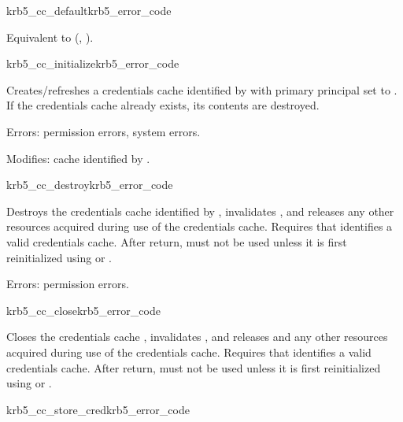 \begin{funcdecl}{krb5_cc_default}{krb5_error_code}{\funcinout}
\funcout
{}
\end{funcdecl}

Equivalent to
(,
).

\begin{funcdecl}{krb5_cc_initialize}{krb5_error_code}{\funcinout}
\funcin
{}
\end{funcdecl}

Creates/refreshes a credentials cache identified by  with
primary principal set to .
If the credentials cache already exists, its contents are destroyed.

Errors:  permission errors, system errors.

Modifies: cache identified by .

\begin{funcdecl}{krb5_cc_destroy}{krb5_error_code}{\funcinout}
\end{funcdecl}

Destroys the credentials cache identified by , invalidates
, and releases any other resources acquired during use of
the credentials cache.  Requires that  identifies a valid
credentials cache.  After return,  must not be used unless
it is first reinitialized using  or
.

Errors:  permission errors.

\begin{funcdecl}{krb5_cc_close}{krb5_error_code}{\funcinout}
\end{funcdecl}

Closes the credentials cache , invalidates
, and releases  and any other resources
acquired during use of the credentials cache.  Requires that
 identifies a valid credentials cache.  After return,
 must not be used unless it is first reinitialized using
 or .


\begin{funcdecl}{krb5_cc_store_cred}{krb5_error_code}{\funcinout}
\funcin
{}
\end{funcdecl}

